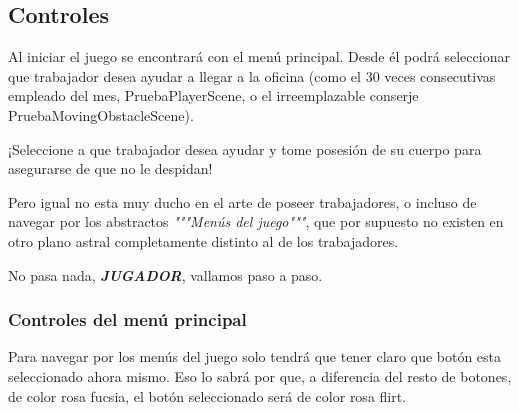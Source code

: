 \subsection{Controles}
Al iniciar el juego se encontrará con el menú principal. Desde él podrá seleccionar que \textcolor{azulWorker}{trabajador} desea ayudar a llegar a la oficina (como el 30 veces consecutivas empleado del mes, PruebaPlayerScene, o el irreemplazable conserje PruebaMovingObstacleScene).

¡Seleccione a que \textcolor{azulWorker}{trabajador} desea ayudar y tome posesión de su cuerpo para asegurarse de que no le despidan!

Pero igual no esta muy ducho en el arte de poseer \textcolor{azulWorker}{trabajadores}, o incluso de navegar por los abstractos \textit{"""Menús del juego"""}, que por supuesto no existen en otro \textcolor{endeavour}{plano astral} completamente distinto al de los \textcolor{azulWorker}{trabajadores}.

No pasa nada, \textit{\textbf{JUGADOR}}, vallamos paso a paso.

\subsubsection{Controles del menú principal}
Para navegar por los menús del juego solo tendrá que tener claro que botón esta seleccionado ahora mismo. Eso lo sabrá por que, a diferencia del resto de botones, de color \textcolor{fucsia}{rosa fucsia}, el botón seleccionado será de color \textcolor{flirk}{rosa flirt}.

